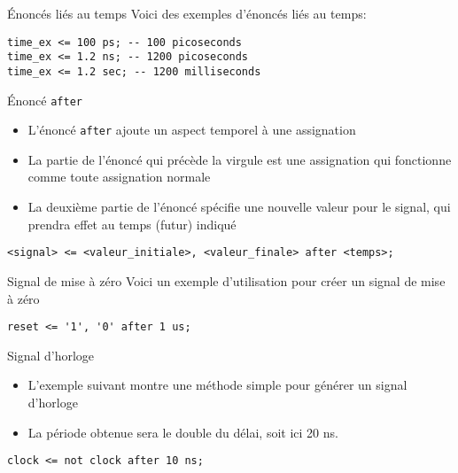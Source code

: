 \documentclass[presentation]{beamer}
\begin{document}
\begin{frame}[label={sec:org6e760cf},fragile]{Énoncés liés au temps}
 Voici des exemples d'énoncés liés au temps:

\begin{verbatim}
time_ex <= 100 ps; -- 100 picoseconds 
time_ex <= 1.2 ns; -- 1200 picoseconds
time_ex <= 1.2 sec; -- 1200 milliseconds
\end{verbatim}
\end{frame}

\begin{frame}[label={sec:orgc1e71cc},fragile]{Énoncé \texttt{after}}
 \begin{itemize}
\item L'énoncé \texttt{after} ajoute un aspect temporel à une assignation
\item La partie de l'énoncé qui précède la virgule est une assignation qui fonctionne comme toute assignation normale
\item La deuxième partie de l'énoncé spécifie une nouvelle valeur pour le signal, qui prendra effet au temps (futur) indiqué
\end{itemize}

\begin{verbatim}
<signal> <= <valeur_initiale>, <valeur_finale> after <temps>;
\end{verbatim}
\end{frame}


\begin{frame}[label={sec:org978f8e5},fragile]{Signal de mise à zéro}
 Voici un exemple d'utilisation pour créer un signal de mise à zéro

\begin{verbatim}
reset <= '1', '0' after 1 us;
\end{verbatim}
\end{frame}

\begin{frame}[label={sec:org39a0107},fragile]{Signal d'horloge}
 \begin{itemize}
\item L'exemple suivant montre une méthode simple pour générer un signal d'horloge
\item La période obtenue sera le double du délai, soit ici 20 ns.
\end{itemize}

\begin{verbatim}
clock <= not clock after 10 ns;
\end{verbatim}
\end{frame}
\end{document}

